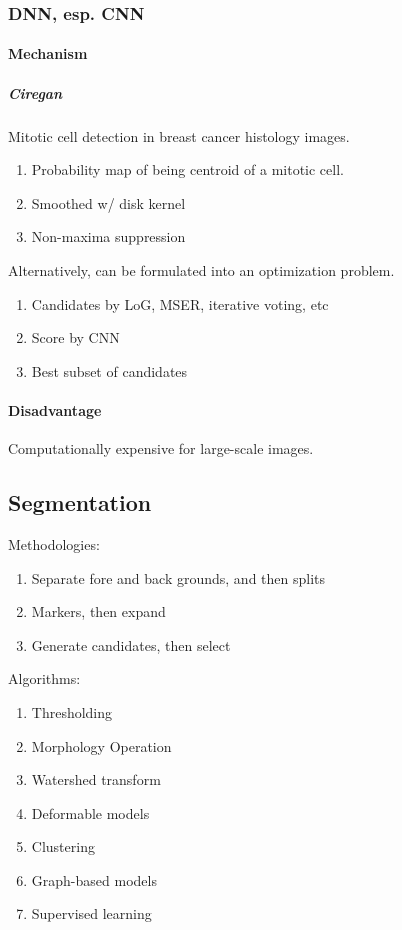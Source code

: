 \documentclass[10pt,a4paper]{article}
\begin{document}
\subsubsection{DNN, esp. CNN}
\paragraph{Mechanism}
\subparagraph{Ciregan} Mitotic cell detection in breast cancer histology images.
\begin{enumerate}
	\item Probability map of being centroid of a mitotic cell.
	\item Smoothed w/ disk kernel
	\item Non-maxima suppression
\end{enumerate}
Alternatively, can be formulated into an optimization problem.
\begin{enumerate}
	\item Candidates by LoG, MSER, iterative voting, etc
	\item Score by CNN
	\item Best subset of candidates
\end{enumerate}
\paragraph{Disadvantage}
Computationally expensive for large-scale images.

\subsection{Segmentation}
Methodologies:
\begin{enumerate}
	\item Separate fore and back grounds, and then splits
	\item Markers, then expand
	\item Generate candidates, then select
\end{enumerate}
Algorithms:
\begin{enumerate}
	\item Thresholding
	\item Morphology Operation
	\item Watershed transform
	\item Deformable models
	\item Clustering
	\item Graph-based models
	\item Supervised learning
\end{enumerate}
\end{document}
